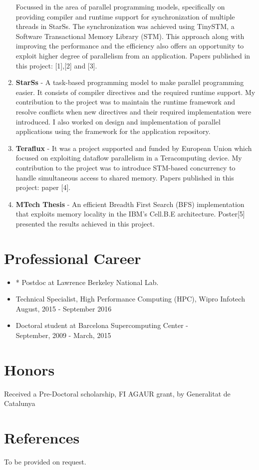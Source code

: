 \documentclass[margin]{res}
\begin{document}
\begin{resume}
\begin{enumerate}
			 Focussed in the area of parallel programming models, specifically on providing compiler and runtime support for synchronization of multiple threads in StarSs.
			 The synchronization was achieved using TinySTM, a Software Transactional Memory Library (STM).
			 This approach along with improving the performance and the efficiency also offers an opportunity to exploit higher degree of parallelism from an application.
			 Papers published in this project: [1],[2] and [3].
%
	   \item {\bf StarSs} -
			 A task-based programming model to make parallel programming easier. It consists of compiler directives and the required runtime support.
			 My contribution to the project was to maintain the runtime framework and resolve conflicts when new directives and their required implementation were introduced.
			 I also worked on design and implementation of parallel applications using the framework for the application repository.
%
	   \item {\bf Teraflux} -
			 It was a project supported and funded by European Union which focused on exploiting dataflow parallelism in a Teracomputing device.
 	    		My contribution to the project was to introduce STM-based concurrency to handle simultaneous access to shared memory.
	     	Papers published in this project: paper [4].
%
	   \item {\bf MTech Thesis} -
		An efficient Breadth First Search (BFS) implementation that exploits memory locality in the IBM's Cell.B.E architecture.
		Poster[5] presented the results achieved in this project.
%
\end{enumerate}
%
\section{Professional Career}
%
\begin{itemize}
    \item * Postdoc at Lawrence Berkeley National Lab.  \\
	   \item Technical Specialist, High Performance Computing (HPC), Wipro Infotech \\
			 August, 2015 - September 2016
	   \item Doctoral student at Barcelona Supercomputing Center - \\
			 September, 2009 - March, 2015
\end{itemize}
%
\section{Honors}
Received a Pre-Doctoral scholarship, FI AGAUR grant,  by Generalitat de Catalunya

%
\section{References}
To be provided on request.
\end{resume}
%
\end{document}

